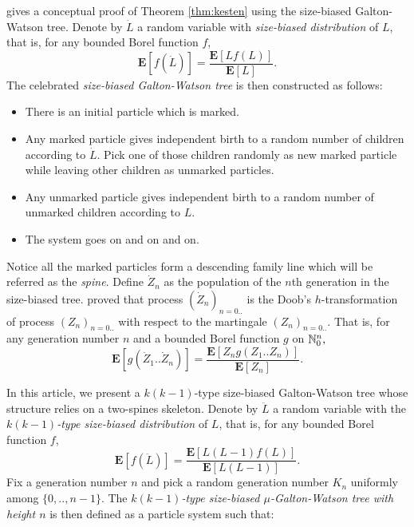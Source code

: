 \documentclass[12pt]{amsart}
\theoremstyle{remark}
\numberwithin{equation}{section}
\newcommand{\defn}[1]{{\em #1}}
\newcommand{\expr}[1]{\left( #1 \right)}
\newcommand{\brac}[1]{\left[ #1 \right]}
\newcommand{\expct}{\mathbf E}
\begin{document}
\par
	\citet*{lyons1995conceptual} gives a conceptual proof of Theorem \ref{thm:kesten} using the size-biased Galton-Watson tree. Denote by $\dot L$ a random variable with \defn{size-biased distribution} of $L$, that is, for any bounded Borel function $f$,
\begin{equation*}
		\expct\brac{f\expr{\dot L}}
	=
		\frac{\expct\brac{Lf(L)}}{\expct\brac{L}}.
\end{equation*}
	The celebrated \defn{size-biased Galton-Watson tree} is then constructed as follows:
\begin{itemize}
\item 
	There is an initial particle which is marked.
\item 
	Any marked particle gives independent birth to a random number of children according to $\dot L$. Pick one of those children randomly as new marked particle while leaving other children as unmarked particles.
\item 
	Any unmarked particle gives independent birth to a random number of unmarked children according to $L$.
\item 
	The system goes on and on and on. 
\end{itemize}
\par
	Notice all the marked particles form a descending family line which will be referred as the \defn{spine}. Define $\dot Z_n$ as the population of the $n$th generation in the size-biased tree. \citet*{lyons1995conceptual} proved that process $(\dot Z_n)_{n=0..}$ is the Doob's $h$-transformation of process $(Z_n)_{n=0..}$ with respect to the martingale $(Z_n)_{n=0..}.$ That is, for any generation number $n$ and a bounded Borel function $g$ on $\mathbb N_0^{n},$
\begin{equation}
\label{eq:htransformation}
		\expct\brac{g\expr{\dot Z_1..\dot Z_n}}
	=
		\frac{\expct\brac{Z_n g\expr{Z_1..Z_n}}}{\expct\brac{Z_n}}.
\end{equation}
\par
	In this article, we present a $k(k-1)$-type size-biased Galton-Watson tree whose structure relies on a two-spines skeleton. Denote by $\ddot L$ a random variable with the \defn{$k(k-1)$-type size-biased distribution} of $L$, that is, for any bounded Borel function $f$,
\begin{equation*}
		\expct\brac{f\expr{\ddot L}}
	=
		\frac{\expct\brac{L(L-1)f(L)}}{\expct\brac{L(L-1)}}.
\end{equation*}
	Fix a generation number $n$ and pick a random generation number $K_n$ uniformly among $\{0,..,n-1\}$. The \defn{$k(k-1)$-type size-biased $\mu$-Galton-Watson tree with height $n$} is then defined as a particle system such that:
\end{document}
